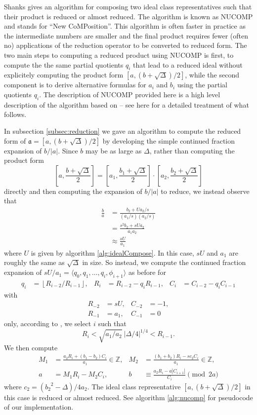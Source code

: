 \documentclass{ucalgthes1}
\theoremstyle{plain}
\theoremstyle{definition}
\newcommand{\ZZ}{\mathbb{Z}}
\newcommand{\floor}[1]{\left\lfloor #1 \right\rfloor}
\begin{document}
Shanks gives an algorithm for composing two ideal class representatives such that their product is reduced or almost reduced.  The algorithm is known as NUCOMP and stands for ``New CoMPosition''.  This algorithm is often faster in practice as the intermediate numbers are smaller and the final product requires fewer (often no) applications of the reduction operator to be converted to reduced form.  The two main steps to computing a reduced product using NUCOMP is first, to compute the the same partial quotients $q_i$ that lead to a reduced ideal without explicitely computing the product form $[a,(b+\sqrt\Delta)/2]$, while the second component is to derive alternative formulas for $a_i$ and $b_i$ using the partial quotients $q_i$.  The description of NUCOMP provided here is a high level description of the algorithm based on \cite[pp.119-123]{Jac09} -- see here for a detailed treatment of what follows.

In subsection \ref{subsec:reduction} we gave an algorithm to compute the reduced form of \break$\mathfrak a = [a, (b+\sqrt\Delta)/2]$ by developing the simple continued fraction expansion of $b/|a|$.  Since $b$ may be as large as $\Delta$, rather than computing the product form
\[
	\left[a, \frac{b+\sqrt\Delta}{2} \right] = \left[a_1, \frac{b_1+\sqrt\Delta}{2} \right] \cdot \left[a_2, \frac{b_2+\sqrt\Delta}{2} \right]
\]
directly and then computing the expansion of $b/|a|$ to reduce, we instead observe that
\begin{align*}
	\frac{b}{a} &= \frac{b_2 + Ua_2/s}{(a_1/s)(a_2/s)} \\
	&= \frac{s^2 b_2+sUa_2}{a_1a_2} \\
	&\approx \frac{sU}{a_1}
\end{align*}
where $U$ is given by algorithm \ref{alg:idealCompose}.  In this case, $sU$ and $a_1$ are roughly the same as $\sqrt\Delta$ in size.  So instead, we compute the continued fraction expansion of $sU/a_1 = \langle q_0, q_1, \dots, q_i, \phi_{i+1} \rangle$ as before for
\begin{align*}
	q_i &= \floor{R_{i-2} / R_{i-1}}, &
	R_i &= R_{i-2} - q_i R_{i-1}, &
	C_i &= C_{i-2} - q_i C_{i-1}
\end{align*}
with
\begin{align*}
	R_{-2} &= sU,  & C_{-2} &= -1, \\
	R_{-1} &= a_1, & C_{-1} &= 0
\end{align*}
only, according to \cite[Theorem 5.43]{Jac09}, we select $i$ such that
\[
	R_i < \sqrt{a_1/a_2} ~ |\Delta/4|^{1/4} < R_{i-1}.
\]
We then compute
\begin{align*}
	M_1 &= \frac{a_2 R_i + (b_1-b_2)C_i}{a_1}  \in \ZZ, &
	M_2 &= \frac{(b_1+b_2) R_i - s c_2 C_i}{a_1} \in \ZZ, \\
	a &= M_1 R_i - M_2 C_i, &
	b &\equiv \frac{a_2 R_i - a |C_{i+1}|}{C_i} \pmod{2a}
\end{align*}
where $c_2 = ({b_2}^2-\Delta)/4a_2$.  The ideal class representative $[a, (b+\sqrt\Delta)/2]$ in this case is reduced or almost reduced.  See algorithm \ref{alg:nucomp} for pseudocode of our implementation.
\end{document}

